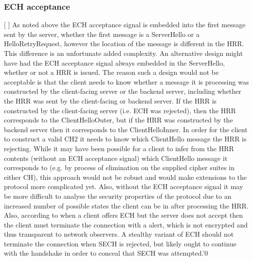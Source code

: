 \subsubsection{ECH acceptance}

[ ] As noted above the ECH acceptance signal is embedded into the first message sent by the server, whether the first message is a ServerHello or a HelloRetryRequest, however the location of the message is different in the HRR. This difference is an unfortunate added complexity. An alternative design might have had the ECH acceptance signal always embedded in the ServerHello, whether or not a HRR is issued. The reason such a design would not be acceptable is that the client needs to know whether a message it is processing was constructed by the client-facing server or the backend server, including whether the HRR was sent by the client-facing or backend server. If the HRR is constructed by the client-facing server (i.e. ECH was rejected), then the HRR corresponds to the ClientHelloOuter, but if the HRR was constructed by the backend server then it corresponds to the ClientHelloInner. In order for the client to construct a valid CH2 it needs to know which ClientHello message the HRR is rejecting.  While it may have been possible for a client to infer from the HRR contents (without an ECH acceptance signal) which ClientHello message it corresponds to (e.g. by process of elimination on the supplied cipher suites in either CH), this approach would not be robust and would make extensions to the protocol more complicated yet. Also, without the ECH acceptance signal it may be more difficult to analyse the security properties of the protocol due to an increased number of possible states the client can be in after processing the HRR.
Also, according to \cite{esni} when a client offers ECH but the server does not accept then the client must terminate the connection with a  alert, which is not encrypted and thus transparent to network observers. A stealthy variant of ECH should not terminate the connection when SECH is rejected, but likely ought to continue with the handshake in order to conceal that SECH was attempted.'0 



